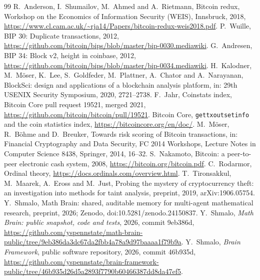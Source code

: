 \documentclass[11pt]{amsart}
\begin{document}
\begin{thebibliography}{99}
 R.~Anderson, I.~Shumailov, M.~Ahmed and A.~Rietmann, Bitcoin redux, Workshop on the Economics of Information Security (WEIS), Innsbruck, 2018, \url{https://www.cl.cam.ac.uk/~rja14/Papers/bitcoin-redux-weis2018.pdf}.
 P.~Wuille, BIP 30: Duplicate transactions, 2012, \url{https://github.com/bitcoin/bips/blob/master/bip-0030.mediawiki}.
 G.~Andresen, BIP 34: Block v2, height in coinbase, 2012, \url{https://github.com/bitcoin/bips/blob/master/bip-0034.mediawiki}.
 H.~Kalodner, M.~M\"oser, K.~Lee, S.~Goldfeder, M.~Plattner, A.~Chator and A.~Narayanan, BlockSci: design and applications of a blockchain analysis platform, in: 29th USENIX Security Symposium, 2020, 2721--2738.
 F.~Jahr, Coinstats index, Bitcoin Core pull request 19521, merged 2021, \url{https://github.com/bitcoin/bitcoin/pull/19521}.
 Bitcoin Core, \texttt{gettxoutsetinfo} and the coin statistics index, \url{https://bitcoincore.org/en/doc/}.
 M.~M\"oser, R.~B\"ohme and D.~Breuker, Towards risk scoring of Bitcoin transactions, in: Financial Cryptography and Data Security, FC 2014 Workshops, Lecture Notes in Computer Science 8438, Springer, 2014, 16--32.
 S.~Nakamoto, Bitcoin: a peer-to-peer electronic cash system, 2008, \url{https://bitcoin.org/bitcoin.pdf}.
 C.~Rodarmor, Ordinal theory, \url{https://docs.ordinals.com/overview.html}.
 T.~Tironsakkul, M.~Maarek, A.~Eross and M.~Just, Probing the mystery of cryptocurrency theft: an investigation into methods for taint analysis, preprint, 2019, arXiv:1906.05754.
 Y.~Shmalo, Math Brain: shared, auditable memory for multi-agent mathematical research, preprint, 2026; Zenodo, doi:10.5281/zenodo.24150837.
 Y.~Shmalo, \emph{Math Brain: public snapshot, code and tests}, 2026, commit 9eb386d, \url{https://github.com/yspennstate/math-brain-public/tree/9eb386da3dc67da2fbb4a78a9d97baaaa1f79b9a}.
 Y.~Shmalo, \emph{Brain Framework}, public software repository, 2026, commit 46b935d, \url{https://github.com/yspennstate/brain-framework-public/tree/46b935d26d5a2893f7790b60466387dd8da47ef5}.
\end{thebibliography}
\end{document}
